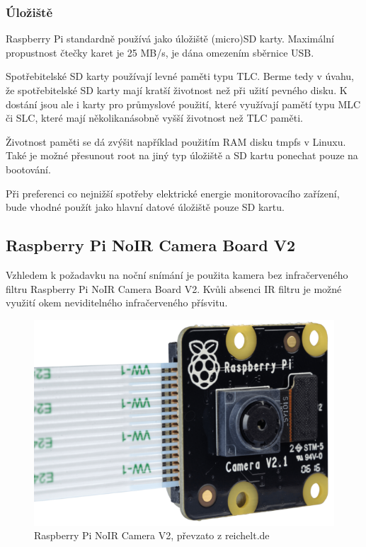 \subsubsection{Úložiště}
Raspberry Pi standardně používá jako úložiště (micro)SD karty. Maximální propustnost čtečky karet je 25 MB/s, je dána omezením sběrnice USB.

Spotřebitelské SD karty používají levné paměti typu TLC. Berme tedy v úvahu, že spotřebitelské SD karty mají kratší životnost než při užití pevného disku. K dostání jsou ale i karty pro průmyslové použití, které využívají pamětí typu MLC či SLC, které mají několikanásobně vyšší životnost než TLC paměti.

Životnost paměti se dá zvýšit například použitím RAM disku tmpfs v Linuxu. Také je možné přesunout root na jiný typ úložiště a SD kartu ponechat pouze na bootování.

Při preferenci co nejnižší spotřeby elektrické energie monitorovacího zařízení, bude vhodné použít jako hlavní datové úložiště pouze SD kartu.

\subsection*{Raspberry Pi NoIR Camera Board V2}
Vzhledem k požadavku na noční snímání je použita kamera bez infračerveného filtru Raspberry Pi NoIR Camera Board V2. Kvůli absenci IR filtru je možné využití okem neviditelného infračerveného přísvitu.

\begin{figure}[h]
  \begin{center}
    \includegraphics[scale=0.3]{obrazky/rpicamera.png}
  \end{center}
  \caption{Raspberry Pi NoIR Camera V2, převzato z reichelt.de}
\end{figure}

